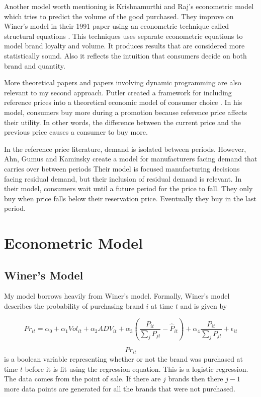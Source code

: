 \documentclass{article}
\begin{document}
Another model worth mentioning is Krishnamurthi and Raj's econometric model which tries to predict the volume of the good purchased. They improve on Winer's model in their 1991 paper using an econometric technique called structural equations \cite{krishnamurthi}. This techniques uses separate econometric equations to model brand loyalty and volume. It produces results that are considered more statistically sound. Also it reflects the intuition that consumers decide on both brand and quantity.

More theoretical papers and papers involving dynamic programming are also relevant to my second approach. Putler created a framework for including reference prices into a theoretical economic model of consumer choice \cite{putler}. In his model, consumers buy more during a promotion because reference price affects their utility. In other words, the difference between the current price and the previous price causes a consumer to buy more.

In the reference price literature, demand is isolated between periods. However, Ahn, Gumus and Kaminsky create a model for manufacturers facing demand that carries over between periods \cite{ahn} Their model is focused manufacturing decisions facing residual demand, but their inclusion of residual demand is relevant. In their model, consumers wait until a future period for the price to fall. They only buy when price falls below their reservation price. Eventually they buy in the last period.

\section{Econometric Model}

\subsection{Winer's Model}
My model borrows heavily from Winer's model. Formally, Winer's model describes the probability of purchasing brand $i$ at time $t$ and is given by

$$ {Pr}_{it} = \alpha_0 + \alpha_1 Vol_{it} + \alpha_2 ADV_{it} +  \alpha_3 (\dfrac{P_{it}} {\sum_j P_{jt}} - \hat{P}_{it})+ \alpha_4 \dfrac {P_{it}}{\sum_j P_{jt}} + \epsilon_{it}$$

$${Pr}_{it}$$ is a boolean variable representing whether or not the brand was purchased at time $t$ before it is fit using the regression equation. This is a logistic regression. The data comes from the point of sale. If there are $j$ brands then there $j-1$ more data points are generated for all the brands that were not purchased.
\end{document}
